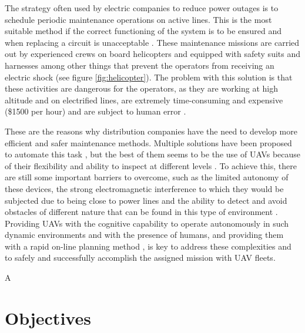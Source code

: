 The strategy often used by electric companies to reduce power outages is to schedule periodic maintenance operations on active lines. This is the most suitable method if the correct functioning of the system is to be ensured and when replacing a circuit is unacceptable \cite{PowerOutagesCauses}. These maintenance missions are carried out by experienced crews on board helicopters and equipped with safety suits and harnesses among other things that prevent the operators from receiving an electric shock (see figure \ref{fig:helicopter}). The problem with this solution is that these activities are dangerous for the operators, as they are working at high altitude and on electrified lines, are extremely time-consuming and expensive (\$1500 per hour) and are subject to human error \cite{MaintenanceCost}.

These are the reasons why distribution companies have the need to develop more efficient and safer maintenance methods. Multiple solutions have been proposed to automate this task \cite{MaintenanceSolutions}, but the best of them seems to be the use of \glspl{UAV} because of their flexibility and ability to inspect at different levels \cite{PowerOutagesCauses}. To achieve this, there are still some important barriers to overcome, such as the limited autonomy of these devices, the strong electromagnetic interference to which they would be subjected due to being close to power lines and the ability to detect and avoid obstacles of different nature that can be found in this type of environment \cite{MaintenanceCost}. Providing UAVs with the cognitive capability to operate autonomously in such dynamic environments and with the presence of humans, and providing them with a rapid on-line planning method \cite{FastOnlinePlanning}, is key to address these complexities and to safely and successfully accomplish the assigned mission with UAV fleets.

A 

\section{Objectives}
\label{sec:Objectives}

